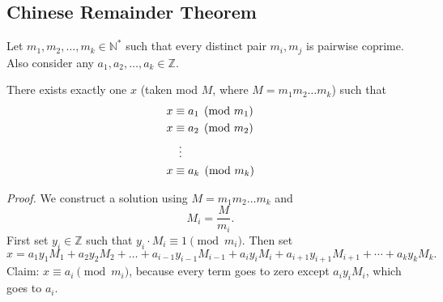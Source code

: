 \documentclass{article}
\begin{document}
    
    

\subsection*{Chinese Remainder Theorem}
    Let $m_{1}, m_{2}, \dots, m_{k} \in \mathbb{N}^{*}$ such that every distinct pair $m_{i}, m_{j}$ is pairwise coprime. Also consider any $a_{1}, a_{2}, \dots, a_{k} \in \mathbb{Z}$.
    
    There exists exactly one $x$ (taken mod $M$, where $M = m_1 m_2 \dots m_k$) such that 
    \begin{align*}
        x &\equiv a_{1} \pmod{m_{1}} \\
        x &\equiv a_{2} \pmod{m_{2}} \\
        &\vdotswithin{ = } \\
        x &\equiv a_{k} \pmod{m_{k}}
    \end{align*}
    
    \textit{Proof. } We construct a solution using $M = m_1 m_2 \dots m_k$ and $$M_{i} = \frac{M}{m_{i}}.$$ First set $y_{i} \in \mathbb{Z}$ such that $y_{i} \cdot M_{i} \equiv 1 \pmod{m_{i}}$.
    Then set $$x = a_{1}y_{1}M_{1} + a_{2}y_{2}M_{2} + \dots + a_{i - 1}y_{i - 1}M_{i - 1} + a_{i}y_{i}M_{i} + a_{i + 1}y_{i + 1}M_{i + 1} + \cdots + a_{k}y_{k}M_{k}.$$
    Claim: $x \equiv a_{i} \pmod{m_{i}}$, because every term goes to zero except $a_{i}y_{i}M_{i}$, which goes to $a_{i}$.
    
\end{document}
